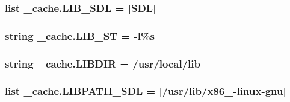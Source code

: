 \subsubsection[{\texorpdfstring{L\+I\+B\+\_\+\+S\+DL}{LIB_SDL}}]{\setlength{\rightskip}{0pt plus 5cm}list \+\_\+cache.\+L\+I\+B\+\_\+\+S\+DL = \mbox{[}\textquotesingle{}S\+DL\textquotesingle{}\mbox{]}}\hypertarget{namespace__cache_acf6ec91a526e860515379d713ce250d0}{}\label{namespace__cache_acf6ec91a526e860515379d713ce250d0}
\subsubsection[{\texorpdfstring{L\+I\+B\+\_\+\+ST}{LIB_ST}}]{\setlength{\rightskip}{0pt plus 5cm}string \+\_\+cache.\+L\+I\+B\+\_\+\+ST = \textquotesingle{}-\/l\%s\textquotesingle{}}\hypertarget{namespace__cache_a244157e2aa1a7c25c1506ad22c2481d8}{}\label{namespace__cache_a244157e2aa1a7c25c1506ad22c2481d8}
\subsubsection[{\texorpdfstring{L\+I\+B\+D\+IR}{LIBDIR}}]{\setlength{\rightskip}{0pt plus 5cm}string \+\_\+cache.\+L\+I\+B\+D\+IR = \textquotesingle{}/usr/local/lib\textquotesingle{}}\hypertarget{namespace__cache_a5430fc8ffbbafabc378f151d608651e1}{}\label{namespace__cache_a5430fc8ffbbafabc378f151d608651e1}
\subsubsection[{\texorpdfstring{L\+I\+B\+P\+A\+T\+H\+\_\+\+S\+DL}{LIBPATH_SDL}}]{\setlength{\rightskip}{0pt plus 5cm}list \+\_\+cache.\+L\+I\+B\+P\+A\+T\+H\+\_\+\+S\+DL = \mbox{[}\textquotesingle{}/usr/lib/x86\+\_-\/linux-\/gnu\textquotesingle{}\mbox{]}}\hypertarget{namespace__cache_a48363bc6728d7c8fa43e722376c8c117}{}\label{namespace__cache_a48363bc6728d7c8fa43e722376c8c117}
